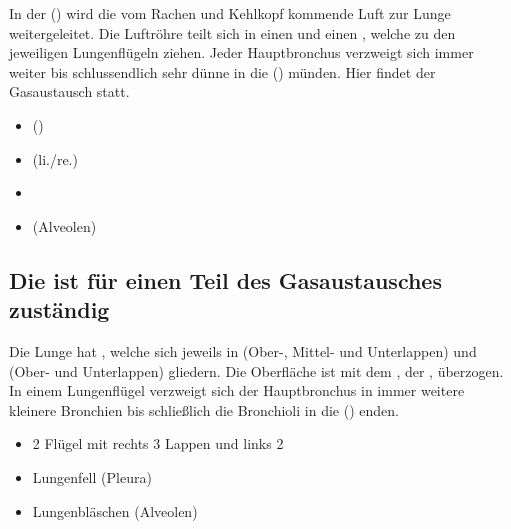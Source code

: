 \begin{Synopsis}

\end{Synopsis}

{%
\label{topic:alveolen}
In der  () wird die vom Rachen und
Kehlkopf kommende Luft zur Lunge weitergeleitet. Die
Luftröhre teilt sich in einen  und einen
 , welche zu den jeweiligen
Lungenflügeln ziehen. Jeder Hauptbronchus verzweigt sich
immer weiter bis schlussendlich sehr dünne  in
die  () münden. Hier findet
der Gasaustausch statt.
}{%
\begin{itemize}
    \item {}
    ()
    \item {} (li./re.)
    \item {}
    \item {}
    ({Alveolen})
\end{itemize}
}{}{}{}





\subsection{Die  ist für einen Teil des
Gasaustausches zuständig}

\TextSlide{\TxBeschreibung}
{
Die Lunge hat , welche sich jeweils in  (Ober-, Mittel- und Unterlappen)
und 
 (Ober- und Unterlappen) gliedern.
Die Oberfläche ist mit dem  
, der 
, überzogen. 
In einem Lungenflügel verzweigt sich
der Hauptbronchus in immer weitere kleinere Bronchien bis
schließlich die Bronchioli in die 
() enden.
}
{
\begin{itemize}
  \item 2 Flügel mit rechts 3 Lappen und links 2
  \item Lungenfell (Pleura)
  \item Lungenbläschen (Alveolen)
\end{itemize}
}{}{}{}

